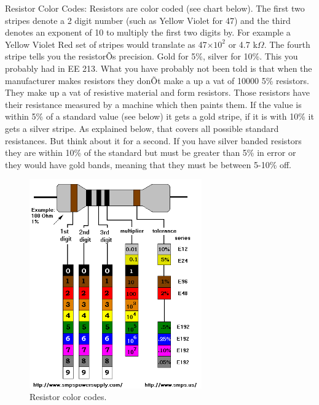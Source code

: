 \documentclass[12pt]{article}
\begin{document}
\begin{enumerate}[1.]
\par Resistor Color Codes: Resistors are color coded (see chart below). 
The first two stripes denote a 2 digit number (such as Yellow Violet for 47) and the third denotes an exponent of 10 to multiply the first two digits by. 
For example a Yellow Violet Red set of stripes would translate as 47$\times10^2$ or 4.7 k$\Omega$. 
The fourth stripe tells you the resistorÕs precision. Gold for 5\%, silver for 10\%. 
This you probably had in EE 213. 
What you have probably not been told is that when the manufacturer makes resistors they donÕt make a up a vat of 10000 5\% resistors. 
They make up a vat of resistive material and form resistors. 
Those resistors have their resistance measured by a machine which then paints them. 
If the value is within 5\% of a standard value (see below) it gets a gold stripe, if it is with 10\% it gets a silver stripe. 
As explained below, that covers all possible standard resistances. 
But think about it for a second. 
If you have silver banded resistors they are within 10\% of the standard but must be greater than 5\% in error or they would have gold bands,
meaning that they must be between 5-10\% off.

\begin{figure}[!ht]
\begin{center}
\includegraphics[width=0.66\textwidth,trim=0 0 0 0,clip=false]{colorcodes.png}
\caption*{Resistor color codes.}
\end{center}
\end{figure}


\end{enumerate}
\end{document}
